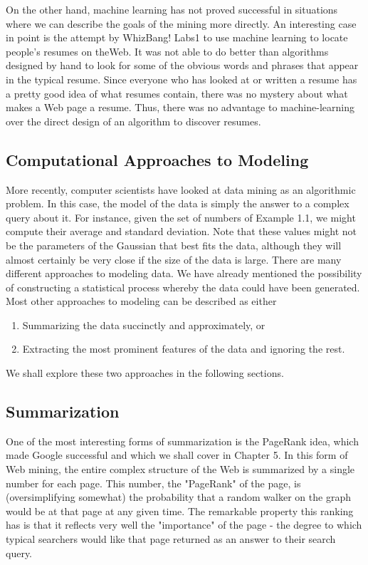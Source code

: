 \documentclass[a4paper, 11pt]{article} %
\begin{document}
On the other hand, machine learning has not proved successful in situations
where we can describe the goals of the mining more directly. An interesting
case in point is the attempt by WhizBang! Labs1 to use machine learning to
locate people’s resumes on theWeb. It was not able to do better than algorithms
designed by hand to look for some of the obvious words and phrases that appear
in the typical resume. Since everyone who has looked at or written a resume has
a pretty good idea of what resumes contain, there was no mystery about what
makes a Web page a resume. Thus, there was no advantage to machine-learning
over the direct design of an algorithm to discover resumes.

\subsection{Computational Approaches to Modeling}

More recently, computer scientists have looked at data mining as an algorithmic
problem. In this case, the model of the data is simply the answer to a complex
query about it. For instance, given the set of numbers of Example 1.1, we might
compute their average and standard deviation. Note that these values might
not be the parameters of the Gaussian that best fits the data, although they
will almost certainly be very close if the size of the data is large.
There are many different approaches to modeling data. We have already
mentioned the possibility of constructing a statistical process whereby the data
could have been generated. Most other approaches to modeling can be described
as either

\begin{enumerate}
\item Summarizing the data succinctly and approximately, or
\item Extracting the most prominent features of the data and ignoring the rest.
\end{enumerate}

We shall explore these two approaches in the following sections.

\subsection{Summarization}

One of the most interesting forms of summarization is the PageRank idea, which
made Google successful and which we shall cover in Chapter 5. In this form
of Web mining, the entire complex structure of the Web is summarized by a
single number for each page. This number, the "PageRank" of the page, is
(oversimplifying somewhat) the probability that a random walker on the graph
would be at that page at any given time. The remarkable property this ranking
has is that it reflects very well the "importance" of the page - the degree to
which typical searchers would like that page returned as an answer to their
search query.\\
\end{document}
